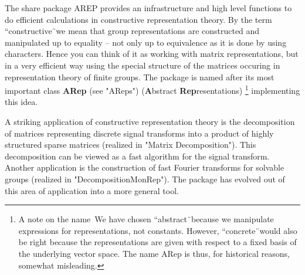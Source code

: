 
%


\newcommand{\AREP}{{\sf AREP}}


The share package {\AREP} provides an infrastructure and high level
functions to do efficient calculations in constructive representation
theory. By the term ``constructive\"\ we mean that group
representations are constructed and manipulated up to equality -- not
only up to equivalence as it is done by using characters. Hence you
can think of it as working with matrix representations, but in a very
efficient way using the special structure of the matrices occuring in
representation theory of finite groups. The package is named after
its most important class {\bf ARep} (see "AReps") ({\bf A}bstract {\bf
Rep}resentations)%
\footnote{%
A note on the name\:\  
We have chosen ``abstract\"\ because we manipulate expressions
for representations, not constants. However, ``concrete\"\ 
would also be right because the representations are given with 
respect to a fixed basis of the underlying vector space. The 
name ARep is thus, for historical reasons, somewhat misleading.
}
implementing this idea.

A striking application of constructive representation theory is the
decomposition of matrices representing discrete signal transforms into
a product of highly structured sparse matrices (realized in 
"Matrix Decomposition"). This decomposition can be viewed as a 
fast algorithm for the signal transform. 
Another application is the construction of
fast Fourier transforms for solvable groups (realized in
"DecompositionMonRep"). The package has evolved out of this area of
application into a more general tool.

